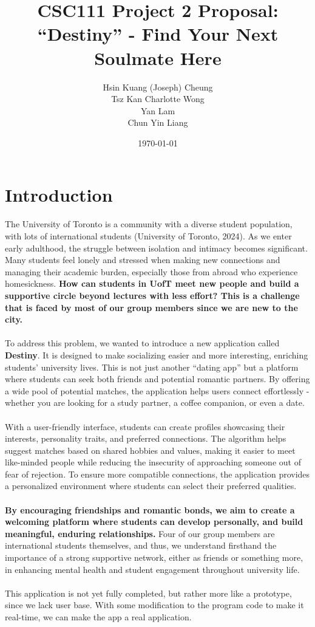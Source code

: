 \documentclass[fontsize=11pt]{article}
\title{CSC111 Project 2 Proposal: \\ \textbf{“Destiny” - Find Your Next Soulmate Here}}
\author{Hsin Kuang (Joseph) Cheung \\ Tsz Kan Charlotte Wong \\ Yan Lam \\ Chun Yin Liang}
\date{\today}
\begin{document}
\maketitle

\section{Introduction}

The University of Toronto is a community with a diverse student population, with lots of international students (University of Toronto, 2024).
As we enter early adulthood, the struggle between isolation and intimacy becomes significant.
Many students feel lonely and stressed when making new connections and managing their academic burden, especially those from abroad who experience homesickness.
\textbf{How can students in UofT meet new people and build a supportive circle beyond lectures with less effort?
This is a challenge that is faced by most of our group members since we are new to the city.}
\\
\\
To address this problem, we wanted to introduce a new application called \textbf{Destiny}.
It is designed to make socializing easier and more interesting, enriching students’ university lives.
This is not just another “dating app” but a platform where students can seek both friends and potential romantic partners. By offering a wide pool of potential matches, the application helps users connect effortlessly - whether you are looking for a study partner, a coffee companion, or even a date.
\\
\\
With a user-friendly interface, students can create profiles showcasing their interests, personality traits, and preferred connections.
The algorithm helps suggest matches based on shared hobbies and values, making it easier to meet like-minded people while 
reducing the insecurity of approaching someone out of fear of rejection. 
To ensure more compatible connections, the application provides a personalized environment where students can select their preferred qualities.
\\
\\
\textbf{By encouraging friendships and romantic bonds, we aim to create a welcoming platform where students can develop personally, and build meaningful, enduring relationships.}
Four of our group members are international students themselves, and thus, we understand firsthand the importance of a strong supportive network, either as friends or something more, in enhancing mental health and student engagement throughout university life.
\\
\\
This application is not yet fully completed, but rather more like a prototype, since we lack user base. 
With some modification to the program code to make it real-time, we can make the app a real application. 
\end{document}
